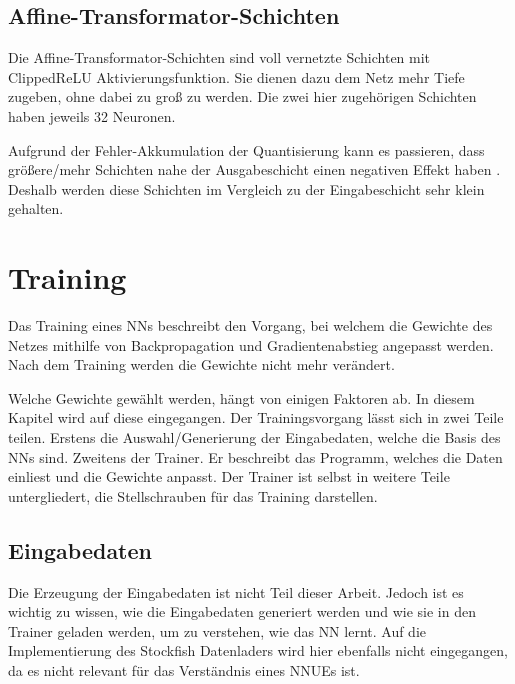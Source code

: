 \subsection{Affine-Transformator-Schichten}

Die Affine-Transformator-Schichten sind voll vernetzte Schichten mit Clipped\ac{ReLU} Aktivierungsfunktion. Sie dienen dazu dem Netz mehr Tiefe zugeben, ohne dabei zu groß zu werden. Die zwei hier zugehörigen Schichten haben jeweils 32 Neuronen.


Aufgrund der Fehler-Akkumulation der Quantisierung kann es passieren, dass größere/mehr Schichten nahe der Ausgabeschicht einen negativen Effekt haben \cite{StockfishNNUE}. Deshalb werden diese Schichten im Vergleich zu der Eingabeschicht sehr klein gehalten.

\section{Training}

Das Training eines \acp{NN} beschreibt den Vorgang, bei welchem die Gewichte des Netzes mithilfe von Backpropagation und Gradientenabstieg angepasst werden. Nach dem Training werden die Gewichte nicht mehr verändert.

Welche Gewichte gewählt werden, hängt von einigen Faktoren ab. In diesem Kapitel wird auf diese eingegangen. Der Trainingsvorgang lässt sich in zwei Teile teilen. Erstens die Auswahl/Generierung der Eingabedaten, welche die Basis des \acp{NN} sind. Zweitens der Trainer. Er beschreibt das Programm, welches die Daten einliest und die Gewichte anpasst. Der Trainer ist selbst in weitere Teile untergliedert, die Stellschrauben für das Training darstellen.

\subsection{Eingabedaten}
\label{chap:inputdata}

Die Erzeugung der Eingabedaten ist nicht Teil dieser Arbeit. Jedoch ist es wichtig zu wissen, wie die Eingabedaten generiert werden und wie sie in den Trainer geladen werden, um zu verstehen, wie das \ac{NN} lernt. Auf die Implementierung des Stockfish Datenladers wird hier ebenfalls nicht eingegangen, da es nicht relevant für das Verständnis eines \acp{NNUE} ist.

